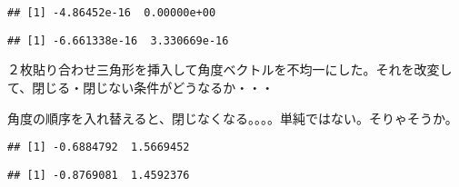 \documentclass[]{article}
\newenvironment{Shaded}{\begin{snugshade}}{\end{snugshade}}
\newcommand{\KeywordTok}[1]{\textcolor[rgb]{0.13,0.29,0.53}{\textbf{#1}}}
\newcommand{\DataTypeTok}[1]{\textcolor[rgb]{0.13,0.29,0.53}{#1}}
\newcommand{\DecValTok}[1]{\textcolor[rgb]{0.00,0.00,0.81}{#1}}
\newcommand{\StringTok}[1]{\textcolor[rgb]{0.31,0.60,0.02}{#1}}
\newcommand{\OperatorTok}[1]{\textcolor[rgb]{0.81,0.36,0.00}{\textbf{#1}}}
\newcommand{\NormalTok}[1]{#1}
\begin{document}
\begin{verbatim}
## [1] -4.86452e-16  0.00000e+00
\end{verbatim}

\begin{Shaded}
\end{Shaded}

\begin{verbatim}
## [1] -6.661338e-16  3.330669e-16
\end{verbatim}

２枚貼り合わせ三角形を挿入して角度ベクトルを不均一にした。それを改変して、閉じる・閉じない条件がどうなるか・・・

角度の順序を入れ替えると、閉じなくなる。。。。単純ではない。そりゃそうか。

\begin{Shaded}
\end{Shaded}

\begin{verbatim}
## [1] -0.6884792  1.5669452
\end{verbatim}

\begin{Shaded}
\end{Shaded}

\begin{verbatim}
## [1] -0.8769081  1.4592376
\end{verbatim}
\end{document}
